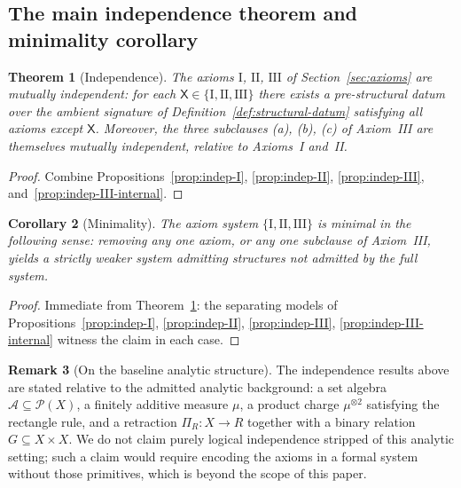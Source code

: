 \documentclass[11pt]{article}
\numberwithin{equation}{section}
\newtheorem{theorem}{Theorem}[section]
\newtheorem{corollary}[theorem]{Corollary}
\theoremstyle{definition}
\newtheorem{remark}[theorem]{Remark}
\begin{document}
\subsection{The main independence theorem and minimality corollary}\label{sec:indep-main}

\begin{theorem}[Independence]\label{thm:independence-main}
The axioms $\mathrm{I}$, $\mathrm{II}$, $\mathrm{III}$ of Section~\ref{sec:axioms} are mutually independent: for each $\mathsf X\in\{\mathrm{I},\mathrm{II},\mathrm{III}\}$ there exists a pre-structural datum over the ambient signature of Definition~\ref{def:structural-datum} satisfying all axioms except $\mathsf X$. Moreover, the three subclauses {\rm(a), (b), (c)} of Axiom~III are themselves mutually independent, relative to Axioms~I and~II.
\end{theorem}

\begin{proof}
Combine Propositions~\ref{prop:indep-I}, \ref{prop:indep-II}, \ref{prop:indep-III}, and~\ref{prop:indep-III-internal}.
\end{proof}

\begin{corollary}[Minimality]\label{cor:minimality}
The axiom system $\{\mathrm{I},\mathrm{II},\mathrm{III}\}$ is minimal in the following sense: removing any one axiom, or any one subclause of Axiom~III, yields a strictly weaker system admitting structures not admitted by the full system.
\end{corollary}

\begin{proof}
Immediate from Theorem~\ref{thm:independence-main}: the separating models of Propositions~\ref{prop:indep-I}, \ref{prop:indep-II}, \ref{prop:indep-III}, \ref{prop:indep-III-internal} witness the claim in each case.
\end{proof}

\begin{remark}[On the baseline analytic structure]\label{rem:baseline-analytic}
The independence results above are stated relative to the admitted analytic background: a set algebra $\mathcal A\subseteq\mathcal P(X)$, a finitely additive measure $\mu$, a product charge $\mu^{\otimes2}$ satisfying the rectangle rule, and a retraction $\Pi_R:X\to R$ together with a binary relation $G\subseteq X\times X$. We do not claim purely logical independence stripped of this analytic setting; such a claim would require encoding the axioms in a formal system without those primitives, which is beyond the scope of this paper.
\end{remark}
\end{document}
